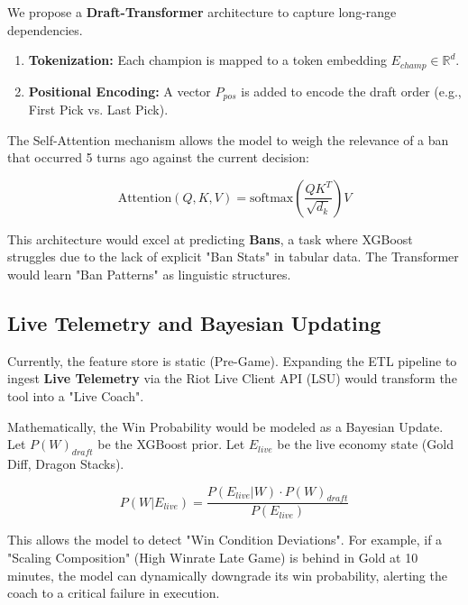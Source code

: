 \documentclass[12pt, a4paper]{article}
\begin{document}
    We propose a \textbf{Draft-Transformer} architecture to capture long-range dependencies.
    \begin{enumerate}
        \item \textbf{Tokenization:} Each champion is mapped to a token embedding $E_{champ} \in \mathbb{R}^{d}$.
        \item \textbf{Positional Encoding:} A vector $P_{pos}$ is added to encode the draft order (e.g., First Pick vs. Last Pick).
    \end{enumerate}

    The Self-Attention mechanism allows the model to weigh the relevance of a ban that occurred 5 turns ago against the current decision:

    \begin{equation}
        \text{Attention}(Q, K, V) = \text{softmax}\left(\frac{QK^T}{\sqrt{d_k}}\right)V
    \end{equation}

    This architecture would excel at predicting \textbf{Bans}, a task where XGBoost struggles due to the lack of explicit "Ban Stats" in tabular data. The Transformer would learn "Ban Patterns" as linguistic structures.

    \subsection{Live Telemetry and Bayesian Updating}
    Currently, the feature store is static (Pre-Game). Expanding the ETL pipeline to ingest \textbf{Live Telemetry} via the Riot Live Client API (LSU) would transform the tool into a "Live Coach".

    Mathematically, the Win Probability would be modeled as a Bayesian Update. Let $P(W)_{draft}$ be the XGBoost prior. Let $E_{live}$ be the live economy state (Gold Diff, Dragon Stacks).

    \begin{equation}
        P(W | E_{live}) = \frac{P(E_{live} | W) \cdot P(W)_{draft}}{P(E_{live})}
    \end{equation}

    This allows the model to detect "Win Condition Deviations". For example, if a "Scaling Composition" (High Winrate Late Game) is behind in Gold at 10 minutes, the model can dynamically downgrade its win probability, alerting the coach to a critical failure in execution.

    \newpage
\end{document}
